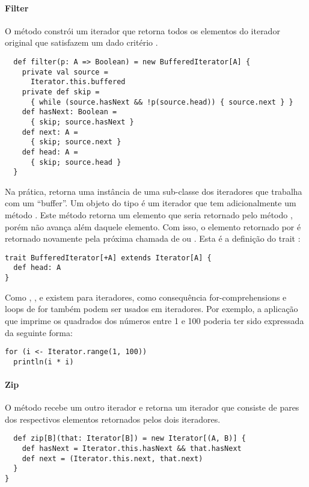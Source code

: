 {\paragraph{Filter} O método  constrói um iterador que retorna
todos os elementos do iterador original que satisfazem um dado critério .
\begin{lstlisting}
  def filter(p: A => Boolean) = new BufferedIterator[A] {
    private val source =
      Iterator.this.buffered
    private def skip =
      { while (source.hasNext && !p(source.head)) { source.next } }
    def hasNext: Boolean =
      { skip; source.hasNext }
    def next: A =
      { skip; source.next }
    def head: A =
      { skip; source.head }
  }
\end{lstlisting}
Na prática,  retorna uma instância de uma sub-classe dos iteradores que trabalha com um
 ``buffer''.  Um objeto do tipo  é um iterador que tem adicionalmente um método
 . Este método retorna um elemento que seria retornado pelo método , porém
não avança além daquele elemento. Com isso, o elemento retornado por  é retornado novamente
pela próxima chamada de  ou . Esta é a definição do trait 
:
\begin{lstlisting}
trait BufferedIterator[+A] extends Iterator[A] {
  def head: A
}
\end{lstlisting}
Como , ,  e 
existem para iteradores, como consequência for-comprehensions e loops de for também podem ser usados em iteradores.
Por exemplo, a aplicação que imprime os quadrados dos números entre 1 e 100 poderia ter sido expressada da seguinte forma:
\begin{lstlisting}
for (i <- Iterator.range(1, 100))
  println(i * i)
\end{lstlisting}

\paragraph{Zip} O método  recebe um outro iterador e retorna um iterador que consiste
de pares dos respectivos elementos retornados pelos dois iteradores.
\begin{lstlisting}
  def zip[B](that: Iterator[B]) = new Iterator[(A, B)] {
    def hasNext = Iterator.this.hasNext && that.hasNext
    def next = (Iterator.this.next, that.next)
  }
}
\end{lstlisting}

}

